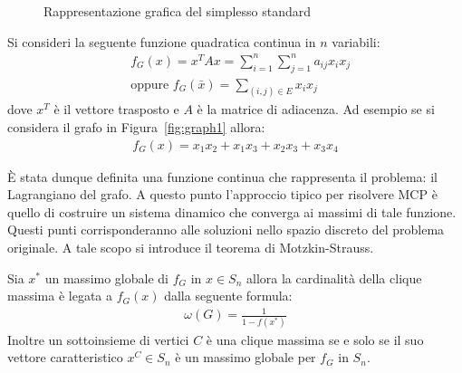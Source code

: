 \begin{figure}[h!]
    \centering
    \caption{Rappresentazione grafica del simplesso standard}
\end{figure}

Si consideri la seguente funzione quadratica continua in $n$ variabili:
\begin{align*}
    &f_G(x) = x^T A x = \sum_{i=1}^n \sum_{j=1}^n a_{ij} x_i x_j \tag{Lagrangiano del grafo} \\
    &\text{oppure } f_G(\bar{x}) = \sum_{(i,j) \in E} x_i x_j
\end{align*}
dove $x^T$ è il vettore trasposto e $A$ è la matrice di adiacenza. Ad esempio se si considera il grafo in Figura~\ref{fig:graph1} allora:
\begin{align*}
    f_G(x) = x_1 x_2 + x_1 x_3 + x_2 x_3 + x_3 x_4
\end{align*}

È stata dunque definita una funzione continua che rappresenta il problema: il Lagrangiano del grafo. A questo punto l'approccio tipico per risolvere MCP è quello di costruire un sistema dinamico che converga ai massimi di tale funzione. Questi punti corrisponderanno alle soluzioni nello spazio discreto del problema originale. A tale scopo si introduce il teorema di Motzkin-Strauss.
\begin{thm}
    Sia $x^*$ un massimo globale di $f_G$ in $x \in S_n$ allora la cardinalità della clique massima è legata a $f_G(x)$  dalla seguente formula:
    \begin{align*}
           \omega(G) = \frac{1}{1 - f(x^*)}
    \end{align*}
    Inoltre un sottoinsieme di vertici $C$ è una clique massima se e solo se il suo vettore caratteristico $x^C \in S_n$ è un massimo globale per $f_G$ in $S_n$.
\end{thm} 
\newpage

